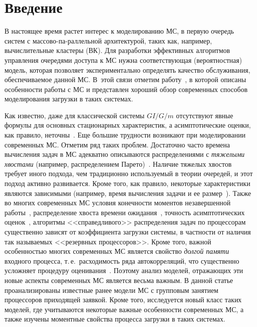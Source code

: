       \thispagestyle{headings}

      \begin{multicols}{2}

            \label{st\stat}
            
\section{Введение}

В настоящее время растет интерес к моделированию МС,  в первую очередь сис\-тем 
с массово-па-\linebreak раллельной
архитектурой, таких как, например,  вы\-чис\-ли\-тель\-ные клас\-те\-ры (ВК).
Для разработки эффектив\-ных алгоритмов управления очередями доступа к
МС нужна соответствующая (вероятностная) модель, которая позволяет
экспериментально определять качество обслуживания, обеспе\-чи\-ва\-емое
данной МС.  В~этой связи отметим работу~\cite{feit-coplot}, в
которой описаны особенности работы с МС и представлен хороший обзор
современных способов моделирования загрузки в таких системах.

Как известно, даже для классической системы $GI/G/m$  отсутствуют
явные формулы для   основных стационарных характеристик, а
асимптотические оценки, как правило, неточны~\cite{gupta10}. Еще
большие    трудности возникают  при моделировании современных МС.
Отметим ряд таких проблем. Достаточно часто  времена вычисления
задач в МС  адекватно описываются  распределениями с {\it тяжелыми
хвостами} (например, распределением Парето)~\cite{feit-coplot, gupta10}. 
Наличие тяжелых хвостов требует иного подхода, чем
традиционно используемый в теории очередей, и этот подход активно
развивается. Кроме того, как правило, некоторые характеристики
являются зависимыми (например, время вычисления задачи и ее
размер~\cite{feit-coplot,krampe10}). Также  во многих современных МС
условия конечности моментов незавершенной работы~\cite{scheller11},
распределение хвоста времени ожидания~\cite{foss06}, точность
асимптотических оценок~\cite{gupta10}, алгоритмы <<справедливого>>
распределения задач по процессорам~\cite{harchol01} существенно
зависят от коэффициента загрузки системы, в частности от наличия
так называемых <<резервных процессоров>>. Кроме того, важной
особенностью многих современных МС является свойство {\it долгой
памяти} входного процесса, т.\,е.\  расходимость ряда автокорреляций,
что существенно усложняет процедуру оценивания~\cite{feit-coplot, krampe10}. 
Поэтому анализ моделей, отражающих эти новые
аспекты современных  МС является весьма важным. В данной статье
проанализированы известные ранее модели МС с групповым занятием
процессоров приходящей заявкой. Кроме того, исследуется новый класс
таких моделей, где учитываются некоторые важные особенности
современных МС, а  также изучены моментные свойства процесса
загрузки в таких системах.


\end{multicols}
